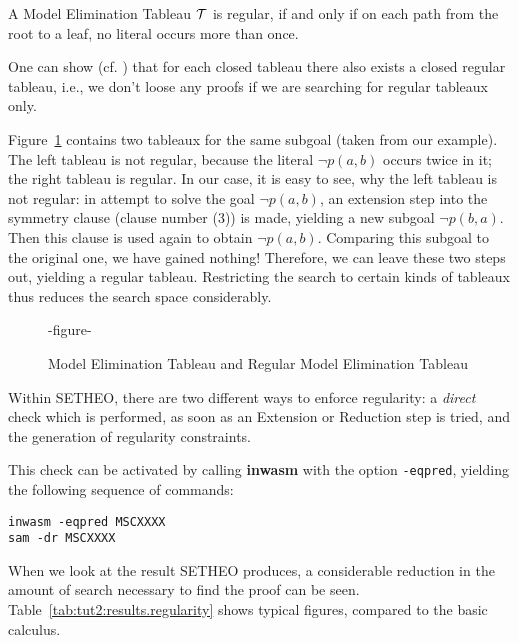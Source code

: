\begin{definition}
A Model Elimination Tableau $\cal T$ is regular, if and only if on
each path from the root to a leaf, no literal occurs more than once.
\end{definition}

One can show (cf. \cite{LSBB89,LMG94}) that for each closed tableau
there also exists a closed regular tableau, i.e., we don't loose any
proofs if we are searching for regular tableaux only.

Figure~\ref{fig:tut2:reg-tab} contains two tableaux for the same
subgoal (taken from our example). The left tableau is not regular,
because the literal $\neg p(a,b)$ occurs twice in it; the right tableau
is regular. In our case, it is easy to see, why the left tableau is
not regular: in attempt to solve the goal $\neg p(a,b)$, an extension
step into the symmetry clause (clause number (3)) is made, yielding
a new subgoal $\neg p(b,a)$. Then this clause is used again to
obtain $\neg p(a,b)$. Comparing this subgoal to the original one,
we have gained nothing! Therefore, we can leave these two steps out,
yielding a regular tableau. Restricting the search to certain kinds
of tableaux thus reduces the search space considerably.

\begin{figure}[htb]
-figure-
\caption{Model Elimination Tableau and Regular Model Elimination Tableau}
\label{fig:tut2:reg-tab}
\end{figure}

Within SETHEO, there are two different ways to enforce regularity:
a {\em direct\/} check which is performed, as soon as an Extension
or Reduction step is tried, and the generation of regularity constraints.

 This check can be
activated by calling {\bf inwasm} with the option {\tt -eqpred},
yielding the following sequence of commands:

\begin{center}
\begin{verbatim}
inwasm -eqpred MSCXXXX
sam -dr MSCXXXX
\end{verbatim}
\end{center}

When we look at the result SETHEO produces, a considerable 
reduction in the amount of search necessary to find the proof
can be seen.
Table~\ref{tab:tut2:results.regularity} shows typical figures, compared
to the basic calculus.

